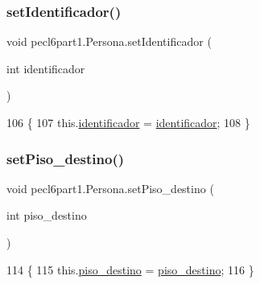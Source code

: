\mbox{\label{classpecl6part1_1_1_persona_a7d2c417c463fe236125b25104de2c079}} 
\subsubsection{\texorpdfstring{set\+Identificador()}{setIdentificador()}}
{\footnotesize\ttfamily void pecl6part1.\+Persona.\+set\+Identificador (\begin{DoxyParamCaption}\item[{int}]{identificador }\end{DoxyParamCaption})\hspace{0.3cm}{\ttfamily [inline]}}


\begin{DoxyCode}
106                                                     \{
107         this.\mbox{\hyperlink{classpecl6part1_1_1_persona_a21697d6304f8709b939317b63daccdcc}{identificador}} = \mbox{\hyperlink{classpecl6part1_1_1_persona_a21697d6304f8709b939317b63daccdcc}{identificador}};
108     \}
\end{DoxyCode}
\mbox{\label{classpecl6part1_1_1_persona_a0449c51124b199b8a5b203aeff1385bc}} 
\subsubsection{\texorpdfstring{set\+Piso\+\_\+destino()}{setPiso\_destino()}}
{\footnotesize\ttfamily void pecl6part1.\+Persona.\+set\+Piso\+\_\+destino (\begin{DoxyParamCaption}\item[{int}]{piso\+\_\+destino }\end{DoxyParamCaption})\hspace{0.3cm}{\ttfamily [inline]}}


\begin{DoxyCode}
114                                                   \{
115         this.\mbox{\hyperlink{classpecl6part1_1_1_persona_a2601b87adc4d07c03478b8a5dec4289e}{piso\_destino}} = \mbox{\hyperlink{classpecl6part1_1_1_persona_a2601b87adc4d07c03478b8a5dec4289e}{piso\_destino}};
116     \}
\end{DoxyCode}
\mbox{\label{classpecl6part1_1_1_persona_ac19fce12d96824b60a212e38bc532cf3}} 
